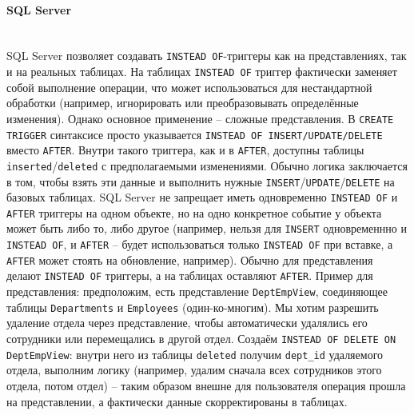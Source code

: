 \paragraph{\textbf{SQL Server}} ~\\
 SQL Server позволяет создавать \texttt{INSTEAD OF}-триггеры как на представлениях, так и на реальных таблицах. На таблицах \texttt{INSTEAD OF} триггер фактически заменяет собой выполнение операции, что может использоваться для нестандартной обработки (например, игнорировать или преобразовывать определённые изменения). Однако основное применение – сложные представления. В \texttt{CREATE TRIGGER} синтаксисе просто указывается \texttt{INSTEAD OF INSERT/UPDATE/DELETE} вместо \texttt{AFTER}. Внутри такого триггера, как и в \texttt{AFTER}, доступны таблицы \texttt{inserted}/\texttt{deleted} с предполагаемыми изменениями. Обычно логика заключается в том, чтобы взять эти данные и выполнить нужные \texttt{INSERT}/\texttt{UPDATE}/\texttt{DELETE} на базовых таблицах. SQL Server не запрещает иметь одновременно \texttt{INSTEAD OF} и \texttt{AFTER} триггеры на одном объекте, но на одно конкретное событие у объекта может быть либо то, либо другое (например, нельзя для \texttt{INSERT} одновременнно и \texttt{INSTEAD OF}, и \texttt{AFTER} – будет использоваться только \texttt{INSTEAD OF} при вставке, а \texttt{AFTER} может стоять на обновление, например). Обычно для представления делают \texttt{INSTEAD OF} триггеры, а на таблицах оставляют \texttt{AFTER}.
 Пример для представления: предположим, есть представление \texttt{DeptEmpView}, соединяющее таблицы \texttt{Departments} и \texttt{Employees} (один-ко-многим). Мы хотим разрешить удаление отдела через представление, чтобы автоматически удалялись его сотрудники или перемещались в другой отдел. Создаём \texttt{INSTEAD OF DELETE ON DeptEmpView}: внутри него из таблицы \texttt{deleted} получим \texttt{dept\_id} удаляемого отдела, выполним логику (например, удалим сначала всех сотрудников этого отдела, потом отдел) – таким образом внешне для пользователя операция прошла на представлении, а фактически данные скорректированы в таблицах.

